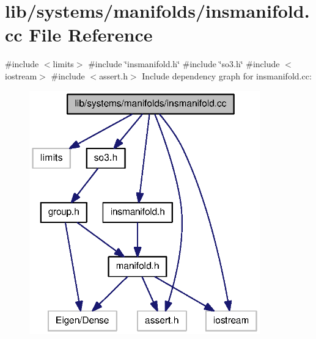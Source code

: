 \section{lib/systems/manifolds/insmanifold.cc \-File \-Reference}
\label{insmanifold_8cc}
{\ttfamily \#include $<$limits$>$}\*
{\ttfamily \#include \char`\"{}insmanifold.\-h\char`\"{}}\*
{\ttfamily \#include \char`\"{}so3.\-h\char`\"{}}\*
{\ttfamily \#include $<$iostream$>$}\*
{\ttfamily \#include $<$assert.\-h$>$}\*
\-Include dependency graph for insmanifold.\-cc\-:\nopagebreak
\begin{figure}[H]
\begin{center}
\leavevmode
\includegraphics[width=283pt]{insmanifold_8cc__incl}
\end{center}
\end{figure}
